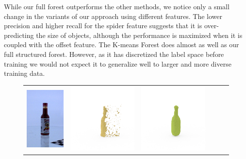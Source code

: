 \documentclass[10pt,twocolumn,letterpaper]{article}
\begin{document}
While our full forest outperforms the other methods, we notice only a small change in the variants of our approach using different features.
The lower precision and higher recall for the spider feature suggests that it is over-predicting the size of objects, although the performance is maximized when it is coupled with the offset feature.
The K-means Forest does almost as well as our full structured forest.
However, as it has discretized the label space before training we would not expect it to generalize well to larger and more diverse training data.


\newcommand{\turnheight}{0.26\columnwidth}
\begin{figure}
    \begin{tabular}{cccccc}
\includegraphics[height=\turnheight, clip=true, trim=30 30 30 30]{data/rgb_ims/tapatio_hot_sauce} &
\includegraphics[height=\turnheight, clip=true, trim=60 30 30 60]{data/renders_turn_table/tapatio_hot_sauce_NP1_312.mat_visible_pixels_view_90} &
\includegraphics[height=\turnheight, clip=true, trim=60 30 30 60]{data/renders_turn_table/tapatio_hot_sauce_NP1_312.mat_gt_view_90} &

\end{tabular}
\end{figure}
\end{document}
